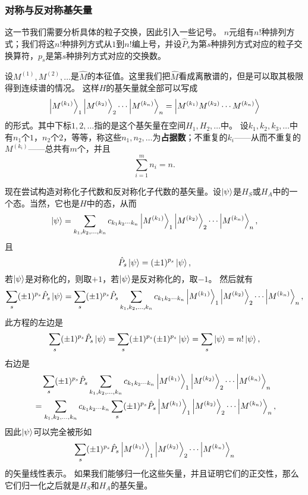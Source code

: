 \documentclass[UTF8, a4paper]{ctexart}
\begin{document}
\subsubsection{对称与反对称基矢量}

这一节我们需要分析具体的粒子交换，因此引入一些记号。
$n$元组有$n!$种排列方式；我们将这$n!$种排列方式从$1$到$n!$编上号，并设$\hat{P}_s$为第$s$种排列方式对应的粒子交换算符，$p_s$是第$s$种排列方式对应的交换数。

设$M^{(1)}, M^{(2)}, \ldots$是$\hat{M}$的本征值。这里我们把$\hat{M}$看成离散谱的，但是可以取其极限得到连续谱的情况。
这样$H$的基矢量就全部可以写成
\[
    \ket{M^{(k_1)}}_1 \ket{M^{(k_2)}}_2 \cdots \ket{M^{(k_n)}}_n = \ket{M^{(k_1)} M^{(k_2)} \cdots M^{(k_n)}}
\]
的形式。其中下标$1, 2, \ldots$指的是这个基矢量在空间$H_1, H_2, \ldots$中。
设$k_1, k_2, k_3, \ldots$中有$n_1$个$1$，$n_2$个$2$，等等，称这些$n_1, n_2, \ldots$为\textbf{占据数}；不重复的$k_i$——从而不重复的$M^{(k_i)}$——总共有$m$个，并且
\begin{equation}
    \sum_{i=1}^m n_i = n.
\end{equation}

现在尝试构造对称化子代数和反对称化子代数的基矢量。设$\ket{\psi}$是$H_S$或$H_A$中的一个态。当然，它也是$H$中的态，从而
\[
    \ket{\psi} = \sum_{k_1, k_2, \ldots, k_n} c_{k_1 k_2 \cdots k_n} \ket{M^{(k_1)}}_1 \ket{M^{(k_2)}}_2 \cdots \ket{M^{(k_n)}}_n,
\]
且
\[
    \hat{P}_s \ket{\psi} = (\pm 1)^{p_s} \ket{\psi},
\]
若$\ket{\psi}$是对称化的，则取$+1$，若$\ket{\psi}$是反对称化的，取$-1$。
然后就有
\[
    \sum_s (\pm 1)^{p_s} \hat{P}_s \ket{\psi} = \sum_s (\pm 1)^{p_s} \hat{P}_s \sum_{k_1, k_2, \ldots, k_n} c_{k_1 k_2 \cdots k_n} \ket{M^{(k_1)}}_1 \ket{M^{(k_2)}}_2 \cdots \ket{M^{(k_n)}}_n,
\]
此方程的左边是
\[
    \sum_s (\pm 1)^{p_s} \hat{P}_s \ket{\psi} = \sum_s (\pm 1)^{p_s} (\pm 1)^{p_s} \ket{\psi} = \sum_s \ket{\psi} = n! \ket{\psi},
\]
右边是
\[
    \begin{aligned}
        &\quad \sum_s (\pm 1)^{p_s} \hat{P}_s \sum_{k_1, k_2, \ldots, k_n} c_{k_1 k_2 \cdots k_n} \ket{M^{(k_1)}}_1 \ket{M^{(k_2)}}_2 \cdots \ket{M^{(k_n)}}_n \\
        &= \sum_{k_1, k_2, \ldots, k_n} c_{k_1 k_2 \cdots k_n} \sum_s (\pm 1)^{p_s} \hat{P}_s \ket{M^{(k_1)}}_1 \ket{M^{(k_2)}}_2 \cdots \ket{M^{(k_n)}}_n,
    \end{aligned}
\]
因此$\ket{\psi}$可以完全被形如
\[
    \sum_s (\pm 1)^{p_s} \hat{P}_s \ket{M^{(k_1)}}_1 \ket{M^{(k_2)}}_2 \cdots \ket{M^{(k_n)}}_n
\]
的矢量线性表示。
如果我们能够归一化这些矢量，并且证明它们的正交性，那么它们归一化之后就是$H_S$和$H_A$的基矢量。
\end{document}
